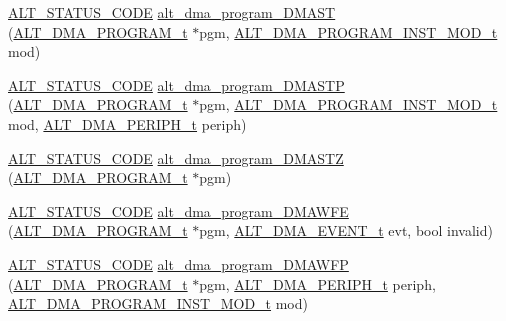 \begin{DoxyCompactItemize}
\item 
\mbox{\hyperlink{hwlib_8h_abdb0d369f069723ca55d6c94bcaaaa12}{A\+L\+T\+\_\+\+S\+T\+A\+T\+U\+S\+\_\+\+C\+O\+DE}} \mbox{\hyperlink{group__ALT__DMA__PRG_ga5a761ebdf88e1da37e54ccd81a6f895c}{alt\+\_\+dma\+\_\+program\+\_\+\+D\+M\+A\+ST}} (\mbox{\hyperlink{group__ALT__DMA__PRG_gadb7028531574894854db4db6d797de97}{A\+L\+T\+\_\+\+D\+M\+A\+\_\+\+P\+R\+O\+G\+R\+A\+M\+\_\+t}} $\ast$pgm, \mbox{\hyperlink{group__ALT__DMA__PRG_gaf8145a0ef11f4188f07bb0c961575d4a}{A\+L\+T\+\_\+\+D\+M\+A\+\_\+\+P\+R\+O\+G\+R\+A\+M\+\_\+\+I\+N\+S\+T\+\_\+\+M\+O\+D\+\_\+t}} mod)
\item 
\mbox{\hyperlink{hwlib_8h_abdb0d369f069723ca55d6c94bcaaaa12}{A\+L\+T\+\_\+\+S\+T\+A\+T\+U\+S\+\_\+\+C\+O\+DE}} \mbox{\hyperlink{group__ALT__DMA__PRG_ga97b73fb7c54dd21f84b85c3b63313982}{alt\+\_\+dma\+\_\+program\+\_\+\+D\+M\+A\+S\+TP}} (\mbox{\hyperlink{group__ALT__DMA__PRG_gadb7028531574894854db4db6d797de97}{A\+L\+T\+\_\+\+D\+M\+A\+\_\+\+P\+R\+O\+G\+R\+A\+M\+\_\+t}} $\ast$pgm, \mbox{\hyperlink{group__ALT__DMA__PRG_gaf8145a0ef11f4188f07bb0c961575d4a}{A\+L\+T\+\_\+\+D\+M\+A\+\_\+\+P\+R\+O\+G\+R\+A\+M\+\_\+\+I\+N\+S\+T\+\_\+\+M\+O\+D\+\_\+t}} mod, \mbox{\hyperlink{group__ALT__DMA__COMMON_gae9baf8ac891f0583f9c1c61528cc1736}{A\+L\+T\+\_\+\+D\+M\+A\+\_\+\+P\+E\+R\+I\+P\+H\+\_\+t}} periph)
\item 
\mbox{\hyperlink{hwlib_8h_abdb0d369f069723ca55d6c94bcaaaa12}{A\+L\+T\+\_\+\+S\+T\+A\+T\+U\+S\+\_\+\+C\+O\+DE}} \mbox{\hyperlink{group__ALT__DMA__PRG_ga3a16bdd999586085c4a274ee1d3c18ba}{alt\+\_\+dma\+\_\+program\+\_\+\+D\+M\+A\+S\+TZ}} (\mbox{\hyperlink{group__ALT__DMA__PRG_gadb7028531574894854db4db6d797de97}{A\+L\+T\+\_\+\+D\+M\+A\+\_\+\+P\+R\+O\+G\+R\+A\+M\+\_\+t}} $\ast$pgm)
\item 
\mbox{\hyperlink{hwlib_8h_abdb0d369f069723ca55d6c94bcaaaa12}{A\+L\+T\+\_\+\+S\+T\+A\+T\+U\+S\+\_\+\+C\+O\+DE}} \mbox{\hyperlink{group__ALT__DMA__PRG_gadb60b4036a6e054f81b4e2bf2dfb2223}{alt\+\_\+dma\+\_\+program\+\_\+\+D\+M\+A\+W\+FE}} (\mbox{\hyperlink{group__ALT__DMA__PRG_gadb7028531574894854db4db6d797de97}{A\+L\+T\+\_\+\+D\+M\+A\+\_\+\+P\+R\+O\+G\+R\+A\+M\+\_\+t}} $\ast$pgm, \mbox{\hyperlink{group__ALT__DMA__COMMON_gad02f1735ad41b201414e8d032e0f9426}{A\+L\+T\+\_\+\+D\+M\+A\+\_\+\+E\+V\+E\+N\+T\+\_\+t}} evt, bool invalid)
\item 
\mbox{\hyperlink{hwlib_8h_abdb0d369f069723ca55d6c94bcaaaa12}{A\+L\+T\+\_\+\+S\+T\+A\+T\+U\+S\+\_\+\+C\+O\+DE}} \mbox{\hyperlink{group__ALT__DMA__PRG_ga4990f947286b37cfda315697743fdd57}{alt\+\_\+dma\+\_\+program\+\_\+\+D\+M\+A\+W\+FP}} (\mbox{\hyperlink{group__ALT__DMA__PRG_gadb7028531574894854db4db6d797de97}{A\+L\+T\+\_\+\+D\+M\+A\+\_\+\+P\+R\+O\+G\+R\+A\+M\+\_\+t}} $\ast$pgm, \mbox{\hyperlink{group__ALT__DMA__COMMON_gae9baf8ac891f0583f9c1c61528cc1736}{A\+L\+T\+\_\+\+D\+M\+A\+\_\+\+P\+E\+R\+I\+P\+H\+\_\+t}} periph, \mbox{\hyperlink{group__ALT__DMA__PRG_gaf8145a0ef11f4188f07bb0c961575d4a}{A\+L\+T\+\_\+\+D\+M\+A\+\_\+\+P\+R\+O\+G\+R\+A\+M\+\_\+\+I\+N\+S\+T\+\_\+\+M\+O\+D\+\_\+t}} mod)

\end{DoxyCompactItemize}
